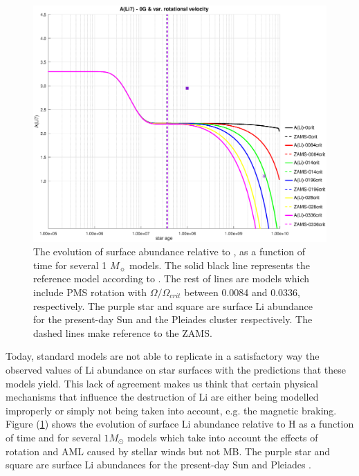 \documentclass[fleqn,usenatbib]{mnras}
\begin{document}
\begin{figure}
	\includegraphics[trim = 40mm 15mm 20mm 15mm, clip, width=\columnwidth]{figures/li_var_vel_0_0g.eps}
    \caption{The evolution of surface  abundance relative to , as a function of time for several 1 $M_{\sun}$ models. The solid black line represents the reference model according to \citet{Choi2016}. The rest of lines are models which include PMS rotation with $\Omega / \Omega_{crit}$ between 0.0084 and 0.0336, respectively. The purple star and square are surface Li abundance for the present-day Sun \citep{Asplund2009} and the Pleiades cluster \citep{Sestito2005} respectively. The dashed lines make reference to the ZAMS.}
    \label{fig:li_var_vel_0g}
\end{figure}

Today, standard models are not able to replicate in a satisfactory way the observed values of Li abundance on star surfaces with the predictions that these models yield. This lack of agreement makes us think that certain physical mechanisms that influence the destruction of Li are either being modelled improperly or simply not being taken into account, e.g. the magnetic braking. Figure (\ref{fig:li_var_vel_0g}) shows the evolution of surface Li abundance relative to H as a function of time and for several $1M_{\odot}$ models which take into account the effects of rotation and AML caused by stellar winds but not MB. The purple star and square are surface Li abundances for the present-day Sun \citep{Asplund2009} and Pleiades \citep{Sestito2005}.\par
\end{document}
